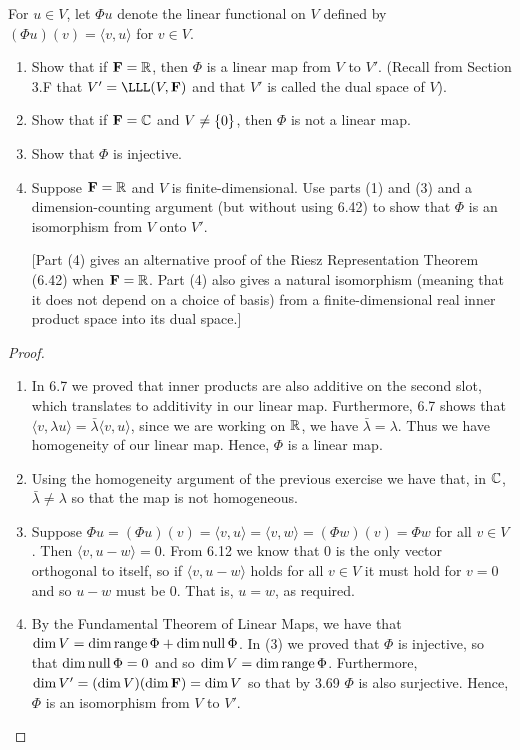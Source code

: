 \begin{exercise}{17}
  For $u\in V$, let $\Phi u$ denote the linear functional on $V$ defined by $(\Phi u)(v)=\langle v,u\rangle$ for $v\in V$.
  \begin{enumerate}
      \item Show that if $\mathbf{F}=\mathbb{R}$, then $\Phi$ is a linear map from $V$ to $V'$. (Recall from Section 3.F that $V'=\LLL(V,\bF)$ and that $V'$ is called the dual space of $V$).
      \item Show that if $\mathbf{F}=\mathbb{C}$ and $V\neq\{0\}$, then $\Phi$ is not a linear map.
      \item Show that $\Phi$ is injective.
      \item Suppose $\mathbf{F}=\mathbb{R}$ and $V$ is finite-dimensional. Use parts (1) and (3) and a dimension-counting argument (but without using 6.42) to show that $\Phi$ is an isomorphism from $V$ onto $V'$.

      [Part (4) gives an alternative proof of the Riesz Representation Theorem (6.42) when $\mathbf{F}=\mathbb{R}$. Part (4) also gives a natural isomorphism (meaning that it does not depend on a choice of basis) from a finite-dimensional real inner product space into its dual space.]
  \end{enumerate}
\end{exercise}
\begin{proof}
 \begin{enumerate}
     \item In 6.7 we proved that inner products are also additive on the second slot, which translates to additivity in our linear map. Furthermore, 6.7 shows that $\langle v,\lambda u\rangle=\bar{\lambda}\langle v,u\rangle$, since we are working on $\mathbb{R}$, we have $\bar{\lambda}=\lambda$. Thus we have homogeneity of our linear map. Hence, $\Phi$ is a linear map.
     \item Using the homogeneity argument of the previous exercise we have that, in $\mathbb{C}$, $\bar{\lambda}\neq\lambda$ so that the map is not homogeneous.
     \item Suppose $\Phi u =(\Phi u)(v) =\langle v,u\rangle =\langle v,w\rangle =(\Phi w)(v) =\Phi w$ for all $v\in V$. Then $\langle v,u-w\rangle=0$. From 6.12 we know that 0 is the only vector orthogonal to itself, so if $\langle v,u-w\rangle$ holds for all $v\in V$ it must hold for $v=0$ and so $u-w$ must be 0. That is, $u=w$, as required.
     \item By the Fundamental Theorem of Linear Maps, we have that $\dim V =\dim\operatorname*{range}\Phi +\dim\operatorname*{null}\Phi$. In (3) we proved that $\Phi$ is injective, so that $\dim\operatorname*{null}\Phi=0$ and so $\dim V=\dim\operatorname*{range}\Phi$. Furthermore, $\dim V'=(\dim V)(\dim\mathbf{F})=\dim V$ so that by 3.69 $\Phi$ is also surjective. Hence, $\Phi$ is an isomorphism from $V$ to $V'$.
 \end{enumerate}
\end{proof}
